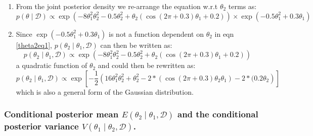 \documentclass[12pt]{article}
\begin{document}
\begin{enumerate}
    \item From the joint posterior density we re-arrange the equation w.r.t $\theta_2$ terms as:
\begin{equation}\label{theta2eq1}
p(\theta \mid \mathcal{D}) \propto \exp \left( -8\theta_1^2\theta_2^2 - 0.5\theta_2^2 + \theta_2(\cos(2\pi + 0.3)\theta_1 + 0.2) \right) \times \exp \left( -0.5\theta_1^2 + 0.3\theta_1 \right) 
\end{equation} 
\item Since  $\exp  \left( -0.5\theta_1^2 + 0.3\theta_1 \right)$  is not a function dependent on $\theta_2$ in eqn  \ref{theta2eq1}, $p(\theta_2 \mid \theta_1 ,\mathcal{D}) $ can then be written as:
 \begin{equation}\label{theta2eq2}
p(\theta_2 \mid \theta_1 ,\mathcal{D}) \propto \exp \left( -8\theta_1^2\theta_2^2 - 0.5\theta_2^2 + \theta_2(\cos(2\pi + 0.3)\theta_1 + 0.2) \right)
\end{equation} 
a quadratic function of $\theta_2$ and could then be rewritten as:
 \begin{equation}\label{theta2eq3}
p(\theta_2 \mid \theta_1 ,\mathcal{D}) \propto \exp\left[- \frac{1}{2}\left( 16\theta_1^2\theta_2^2 + \theta_2^2 - 2*(\cos(2\pi + 0.3)\theta_2 \theta_1) - 2*(0.2\theta_2 \right)\right]
\end{equation} which is also a general form of the Gaussian distribution.
   
\end{enumerate}
\subsubsection{Conditional posterior mean \(E(\theta_2 \mid \theta_1, \mathcal{D})\) and the conditional posterior variance \(V(\theta_1 \mid \theta_2, \mathcal{D})\).}
\end{document}
